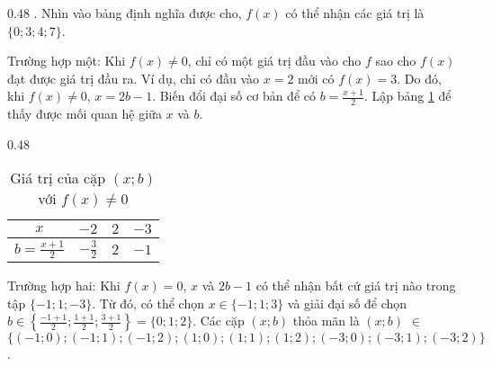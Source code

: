 {
   \begin{minipageindent}{0.48\textwidth}
      . Nhìn vào bảng định nghĩa được cho, $f(x)$ có thể nhận các giá trị là $\{0; 3; 4; 7\}$.

      \textcolor{colorEmphasis}{Trường hợp một}: Khi $f(x) \neq 0$, chỉ có một giá trị đầu vào cho $f$ sao cho $f(x)$ đạt được giá trị đầu ra. Ví dụ, chỉ có đầu vào $x = 2$ mới có $f(x) = 3$. Do đó, khi $f(x) \neq 0$, $x = 2b-1$. Biến đổi đại số cơ bản để có $b = \frac{x + 1}{2}$. Lập bảng \ref{tab:ham_so_mot_bien:dinh_nghia:b_values7} để thấy được mối quan hệ giữa $x$ và $b$.

   \end{minipageindent}
   \hfill
   \begin{minipageindent}{0.48\textwidth}
      \begin{table}[H]
         \centering
         \begin{tabular}{|c|c|c|c|}
            \hline
            $x$ & $-2$ & $2$ & $-3$\\
            \hline
            $b = \frac{x+1}{2}$ & $-\frac{3}{2}$ & $2$ & $-1$\\
            \hline
         \end{tabular}
         \caption{Giá trị của cặp $(x; b)$ với $f(x) \neq 0$}
         \label{tab:ham_so_mot_bien:dinh_nghia:b_values7}
      \end{table}
   \end{minipageindent}
}

\textcolor{colorEmphasisCyan}{Trường hợp hai}: Khi $f(x) = 0$, $x$ và $2b-1$ có thể nhận bất cứ giá trị nào trong tập $\{-1; 1; -3\}$. Từ đó, có thể chọn $x \in \{-1; 1; 3\}$ và giải đại số để chọn $b \in \left\{\frac{-1+1}{2}; \frac{1+1}{2}; \frac{3+1}{2}\right\} = \{0; 1; 2\}$. Các cặp $(x; b)$ thỏa mãn là $(x; b)$ $\in$ $\{\left(-1; 0\right); \left(-1; 1\right); \left(-1; 2\right); \left(1; 0\right); \left(1; 1\right); \left(1; 2\right); \left(-3; 0\right); \left(-3; 1\right); \left(-3; 2\right)\}$.

